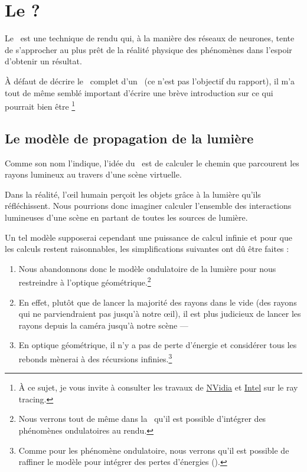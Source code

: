 \section{Le \raytracing ?}
Le \raytracing{}\ est une technique de rendu qui, à la manière des réseaux de
neurones, tente de s'approcher au plus prêt de la réalité physique des
phénomènes dans l'espoir d'obtenir un résultat. 

À défaut de décrire le \ complet d'un \ (ce
n'est pas l'objectif du rapport), il m'a tout de même semblé important
d'écrire une brève introduction sur ce qui pourrait bien être \footnote{À ce sujet,
je vous invite à consulter les travaux de
\href{http://developer.nvidia.com/optix}{NVidia} et
\href{http://www.tgdaily.com/business-and-law-features/36606-inside-intels-ray-tracing-research}{Intel}
sur le ray tracing.}

\subsection{Le modèle de propagation de la lumière}
Comme son nom l'indique, l'idée du \raytracing{}\ est de calculer le chemin que
parcourent les rayons lumineux au travers d'une scène virtuelle.

Dans la réalité, l'œil humain perçoit les objets grâce à la lumière qu'ils
réfléchissent. Nous pourrions donc imaginer calculer l'ensemble des
interactions lumineuses d'une scène en partant de toutes les sources de
lumière. 

Un tel modèle supposerai cependant une puissance de calcul infinie et pour que
les calculs restent raisonnables, les simplifications suivantes ont dû être
faites : 
\begin{enumerate}
  \item {} Nous abandonnons donc le
    modèle ondulatoire de la lumière pour nous restreindre à l'optique
    géométrique.\footnote{Nous verrons tout de même dans la \ qu'il est possible d'intégrer des phénomènes
    ondulatoires au rendu.}

  \item {} En effet, plutôt que de lancer la majorité des rayons dans le vide
    (\ie des rayons qui ne parviendraient pas jusqu'à notre œil), il est plus
    judicieux de lancer les rayons depuis la caméra jusqu'à notre scène --- 

  \item {} En optique
    géométrique, il n'y a pas de perte d'énergie et considérer tous les rebonds
    mènerai à des récursions infinies.\footnote{Comme pour les phénomène
    ondulatoire, nous verrons qu'il est possible de raffiner le modèle pour
    intégrer des pertes d'énergies (\cf {}).}
\end{enumerate}

